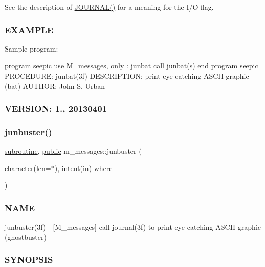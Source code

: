 See the description of \hyperlink{M__journal_83_8txt_aee6db01e1c6132b5b3f146b5a0c6e7e1}{J\+O\+U\+R\+N\+A\+L()} for a meaning for the I/O flag.

\subsubsection*{E\+X\+A\+M\+P\+LE}

Sample program\+:

program seepic use M\+\_\+messages, only \+: junbat call junbat(\textquotesingle{}s\textquotesingle{}) end program seepic P\+R\+O\+C\+E\+D\+U\+RE\+: junbat(3f) D\+E\+S\+C\+R\+I\+P\+T\+I\+ON\+: print eye-\/catching A\+S\+C\+II graphic (bat) A\+U\+T\+H\+OR\+: John S. Urban \subsubsection*{V\+E\+R\+S\+I\+ON\+: 1., 20130401}\mbox{\label{namespacem__messages_a8d5bfbeee271ab7e419dc9960caf5221}} 
\subsubsection{\texorpdfstring{junbuster()}{junbuster()}}
{\footnotesize\ttfamily \hyperlink{M__stopwatch_83_8txt_acfbcff50169d691ff02d4a123ed70482}{subroutine}, \hyperlink{M__stopwatch_83_8txt_a2f74811300c361e53b430611a7d1769f}{public} m\+\_\+messages\+::junbuster (\begin{DoxyParamCaption}\item[{\hyperlink{option__stopwatch_83_8txt_abd4b21fbbd175834027b5224bfe97e66}{character}(len=$\ast$), intent(\hyperlink{M__journal_83_8txt_afce72651d1eed785a2132bee863b2f38}{in})}]{where }\end{DoxyParamCaption})}



\subsubsection*{N\+A\+ME}

junbuster(3f) -\/ \mbox{[}M\+\_\+messages\mbox{]} call journal(3f) to print eye-\/catching A\+S\+C\+II graphic (ghostbuster) 

\subsubsection*{S\+Y\+N\+O\+P\+S\+IS}

